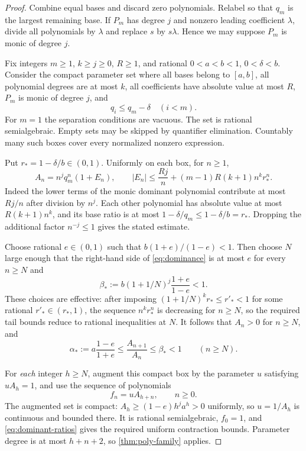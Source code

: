 \begin{proof}
Combine equal bases and discard zero polynomials. Relabel so that
$q_m$ is the largest remaining base. If $P_m$ has degree $j$ and
nonzero leading coefficient $\lambda$, divide all polynomials by
$\lambda$ and replace $s$ by $s\lambda$. Hence we may suppose
$P_m$ is monic of degree $j$.

Fix integers $m\ge1$, $k\ge j\ge0$, $R\ge1$, and rational
$0<a<b<1$, $0<\delta<b$. Consider the compact parameter set where
all bases belong to $[a,b]$, all polynomial degrees are at most $k$,
all coefficients have absolute value at most $R$, $P_m$ is monic of
degree $j$, and
\[
 q_i\le q_m-\delta\quad(i<m).
\]
For $m=1$ the separation conditions are vacuous. The set is rational
semialgebraic. Empty sets may be skipped by quantifier elimination.
Countably many such boxes cover every normalized nonzero expression.

Put $r_*=1-\delta/b\in(0,1)$. Uniformly on each box, for $n\ge1$,
\begin{equation}\label{eq:dominance}
 A_n=n^jq_m^n(1+E_n),\qquad
 |E_n|\le \frac{Rj}{n}+(m-1)R(k+1)n^k r_*^n.
\end{equation}
Indeed the lower terms of the monic dominant polynomial contribute
at most $Rj/n$ after division by $n^j$. Each other polynomial has
absolute value at most $R(k+1)n^k$, and its base ratio is at most
$1-\delta/q_m\le1-\delta/b=r_*$. Dropping the additional factor
$n^{-j}\le1$ gives the stated estimate.

Choose rational $e\in(0,1)$ such that $b(1+e)/(1-e)<1$.
Then choose $N$ large enough that the right-hand side of
\eqref{eq:dominance} is at most $e$ for every $n\ge N$ and
\[
 \beta_*:=b(1+1/N)^j\frac{1+e}{1-e}<1.
\]
These choices are effective: after imposing
$(1+1/N)^kr_*\le r'_*<1$ for some rational $r'_*\in(r_*,1)$,
the sequence $n^kr_*^n$ is decreasing for $n\ge N$, so the
required tail bounds reduce to rational inequalities at $N$.
It follows that $A_n>0$ for $n\ge N$, and
\begin{equation}\label{eq:dominant-ratios}
 \alpha_*:=a\frac{1-e}{1+e}
 \le\frac{A_{n+1}}{A_n}\le\beta_*<1
 \qquad(n\ge N).
\end{equation}

For \emph{each} integer $h\ge N$, augment this compact box by the
parameter $u$ satisfying $uA_h=1$, and use the sequence of polynomials
\[
 f_n=uA_{h+n},\qquad n\ge0.
\]
The augmented set is compact: $A_h\ge(1-e)h^j a^h>0$ uniformly,
so $u=1/A_h$ is continuous and bounded there. It is rational
semialgebraic, $f_0=1$, and \eqref{eq:dominant-ratios} gives the
required uniform contraction bounds. Parameter degree is at most
$h+n+2$, so \cref{thm:poly-family} applies.


\end{proof}
